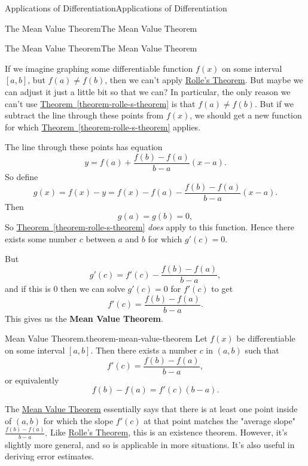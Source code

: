 \documentclass[10pt,]{book}
\newcommand{\terminology}[1]{\textbf{#1}}
\numberwithin{equation}{section}
\begin{document}
\begin{chapterptx}{Applications of Differentiation}{}{Applications of Differentiation}{}{}
\begin{sectionptx}{The Mean Value Theorem}{}{The Mean Value Theorem}{}{}
\begin{subsectionptx}{The Mean Value Theorem}{}{The Mean Value Theorem}{}{}
\par
\hypertarget{p-335}{}%
If we imagine graphing some differentiable function \(f(x)\) on some interval \([a,b]\), but \(f(a)\neq f(b)\), then we can't apply \hyperref[theorem-rolle-s-theorem]{Rolle's Theorem}. But maybe we can adjust it just a little bit so that we can? In particular, the only reason we can't use \hyperref[theorem-rolle-s-theorem]{Theorem~\ref{theorem-rolle-s-theorem}} is that \(f(a)\neq f(b)\). But if we subtract the line through these points from \(f(x)\), we should get a new function for which \hyperref[theorem-rolle-s-theorem]{Theorem~\ref{theorem-rolle-s-theorem}} applies.%
\par
\hypertarget{p-336}{}%
The line through these points has equation%
\begin{equation*}
y = f(a) + \frac{f(b) - f(a)}{b-a}(x-a).
\end{equation*}
So define%
\begin{equation*}
g(x) = f(x) - y = f(x) - f(a) - \frac{f(b) - f(a)}{b-a}(x-a).
\end{equation*}
Then%
\begin{equation*}
g(a) = g(b) = 0,
\end{equation*}
So \hyperref[theorem-rolle-s-theorem]{Theorem~\ref{theorem-rolle-s-theorem}} \emph{does} apply to this function. Hence there exists some number \(c\) between \(a\) and \(b\) for which \(g'(c) = 0\).%
\par
\hypertarget{p-337}{}%
But%
\begin{equation*}
g'(c) = f'(c) - \frac{f(b) - f(a)}{b-a},
\end{equation*}
and if this is \(0\) then we can solve \(g'(c) = 0\) for \(f'(c)\) to get%
\begin{equation*}
f'(c) = \frac{f(b) - f(a)}{b-a}.
\end{equation*}
This gives us the \terminology{Mean Value Theorem}.%
\begin{theorem}{Mean Value Theorem.}{}{theorem-mean-value-theorem}%
\hypertarget{p-338}{}%
Let \(f(x)\) be differentiable on some interval \([a,b]\). Then there exists a number \(c\) in \((a,b)\) such that%
\begin{equation*}
f'(c) = \frac{f(b) - f(a)}{b-a},
\end{equation*}
or equivalently%
\begin{equation*}
f(b) - f(a) = f'(c)(b-a).
\end{equation*}
%
\end{theorem}
\hypertarget{p-339}{}%
The \hyperref[theorem-mean-value-theorem]{Mean Value Theorem} essentially says that there is at least one point inside of \((a,b)\) for which the slope \(f'(c)\) at that point matches the "average slope" \(\frac{f(b) - f(a)}{b-a}.\) Like \hyperref[theorem-rolle-s-theorem]{Rolle's Theorem}, this is an existence theorem. However, it's slightly more general, and so is applicable in more situations. It's also useful in deriving error estimates.%

\end{subsectionptx}
\end{sectionptx}
\end{chapterptx}
\end{document}
